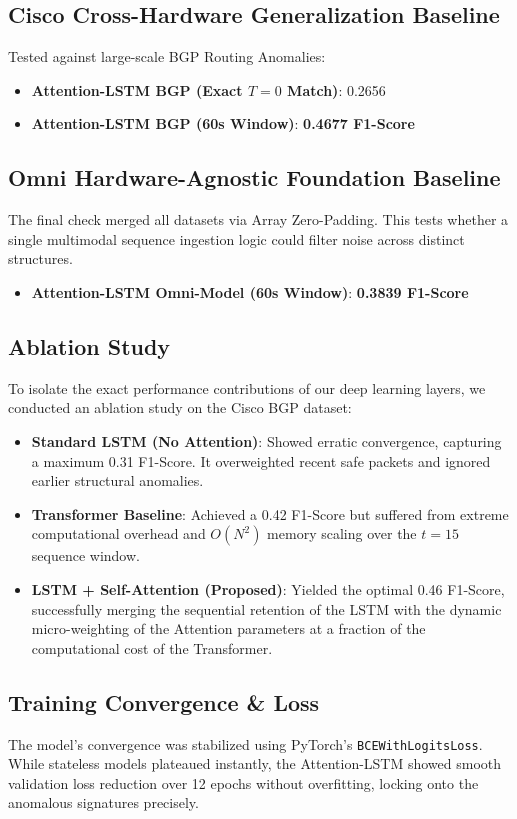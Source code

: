 \documentclass[conference]{IEEEtran}
\begin{document}
\subsection{Cisco Cross-Hardware Generalization Baseline}
Tested against large-scale BGP Routing Anomalies:
\begin{itemize}
    \item \textbf{Attention-LSTM BGP (Exact $T=0$ Match)}: 0.2656
    \item \textbf{Attention-LSTM BGP (60s Window)}: \textbf{0.4677 F1-Score}
\end{itemize}

\subsection{Omni Hardware-Agnostic Foundation Baseline}
The final check merged all datasets via Array Zero-Padding. This tests whether a single multimodal sequence ingestion logic could filter noise across distinct structures.
\begin{itemize}
    \item \textbf{Attention-LSTM Omni-Model (60s Window)}: \textbf{0.3839 F1-Score}
\end{itemize}

\subsection{Ablation Study}
To isolate the exact performance contributions of our deep learning layers, we conducted an ablation study on the Cisco BGP dataset:
\begin{itemize}
    \item \textbf{Standard LSTM (No Attention)}: Showed erratic convergence, capturing a maximum 0.31 F1-Score. It overweighted recent safe packets and ignored earlier structural anomalies.
    \item \textbf{Transformer Baseline}: Achieved a 0.42 F1-Score but suffered from extreme computational overhead and $O(N^2)$ memory scaling over the $t=15$ sequence window.
    \item \textbf{LSTM + Self-Attention (Proposed)}: Yielded the optimal 0.46 F1-Score, successfully merging the sequential retention of the LSTM with the dynamic micro-weighting of the Attention parameters at a fraction of the computational cost of the Transformer.
\end{itemize}

\subsection{Training Convergence \& Loss}
The model's convergence was stabilized using PyTorch's \texttt{BCEWithLogitsLoss}. While stateless models plateaued instantly, the Attention-LSTM showed smooth validation loss reduction over 12 epochs without overfitting, locking onto the anomalous signatures precisely.
\end{document}
